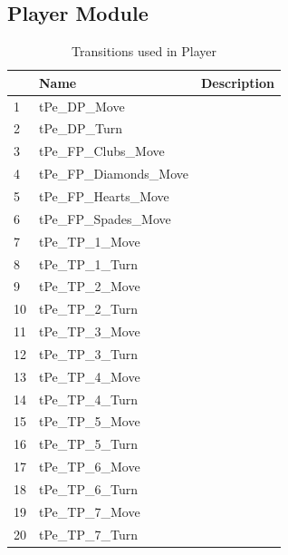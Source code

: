 \documentclass[runningheads,a4paper]{llncs}
\begin{document}
\subsection{Player Module}
\begin{table}
	\caption{Transitions used in Player}
	\begin{tabular}{|l|l|l|}
		\hline
		& Name & Description \\
		\hline
		1 & tPe\_DP\_Move            &    \\ \hline
		2 & tPe\_DP\_Turn            &    \\ \hline
		3 & tPe\_FP\_Clubs\_Move     &    \\ \hline
		4 & tPe\_FP\_Diamonds\_Move  &    \\ \hline
		5 & tPe\_FP\_Hearts\_Move    &    \\ \hline
		6 & tPe\_FP\_Spades\_Move    &    \\ \hline
		7 & tPe\_TP\_1\_Move         &    \\ \hline
		8 & tPe\_TP\_1\_Turn         &    \\ \hline
		9 & tPe\_TP\_2\_Move         &    \\ \hline
		10 & tPe\_TP\_2\_Turn        &    \\ \hline
		11 & tPe\_TP\_3\_Move        &    \\ \hline
		12 & tPe\_TP\_3\_Turn        &    \\ \hline
		13 & tPe\_TP\_4\_Move        &    \\ \hline
		14 & tPe\_TP\_4\_Turn        &    \\ \hline
		15 & tPe\_TP\_5\_Move        &    \\ \hline
		16 & tPe\_TP\_5\_Turn        &    \\ \hline
		17 & tPe\_TP\_6\_Move        &    \\ \hline
		18 & tPe\_TP\_6\_Turn        &    \\ \hline
		19 & tPe\_TP\_7\_Move        &    \\ \hline
		20 & tPe\_TP\_7\_Turn        &    \\ \hline
	\end{tabular}
\end{table}
\clearpage
\end{document}
